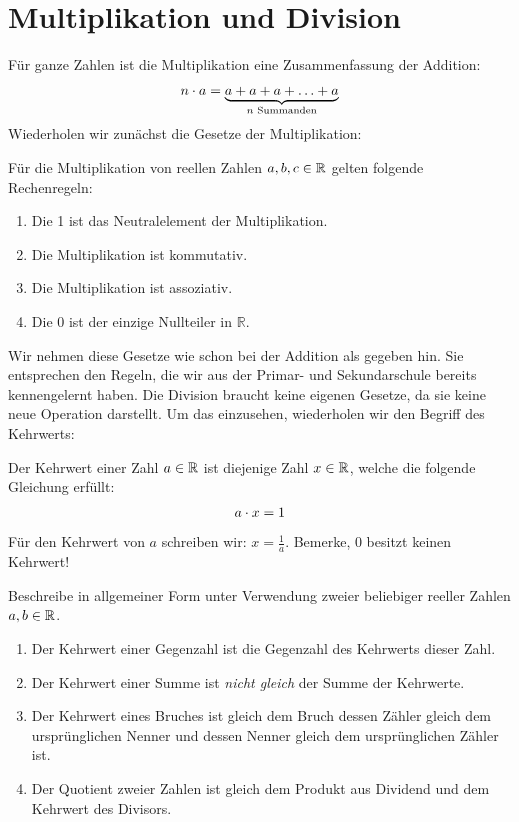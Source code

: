 \documentclass[11pt,oneside]{article}
\begin{document}
\newpage
\section{Multiplikation und Division}
    Für ganze Zahlen ist die Multiplikation eine Zusammenfassung der Addition:
    \begin{align*}
	   n \cdot a = \underbrace{a + a + a + \ldots + a}_{n \text{ Summanden}}
    \end{align*}
    Wiederholen wir zunächst die Gesetze der Multiplikation:
    \begin{satz}\label{satz:GesetzeDerMultiplikation}
    	Für die Multiplikation von reellen Zahlen $a,b,c\in\mathbb{R}$ gelten folgende Rechenregeln:
    	\begin{enumerate}
    		\item Die 1 ist das Neutralelement der Multiplikation.
    		\item Die Multiplikation ist kommutativ.
    		\item Die Multiplikation ist assoziativ.
    		\item Die 0 ist der einzige Nullteiler in $ \mathbb{R} $.
    	\end{enumerate}
    \end{satz}
    Wir nehmen diese Gesetze wie schon bei der Addition als gegeben hin. Sie entsprechen den Regeln, die wir aus der Primar- und Sekundarschule bereits kennengelernt haben. Die Division braucht keine eigenen Gesetze, da sie keine neue Operation darstellt. Um das einzusehen, wiederholen wir den Begriff des Kehrwerts:
    \begin{definition}
    	Der Kehrwert einer Zahl $a\in\mathbb{R}$ ist diejenige Zahl $x\in\mathbb{R}$, welche die folgende Gleichung erfüllt:
    	\begin{align*}
    		a\cdot x=1
    	\end{align*}
    	Für den Kehrwert von $a$ schreiben wir: $x=\frac{1}{a}$. Bemerke, $0$ besitzt keinen Kehrwert!
    \end{definition}
    \begin{beispiel}
    	Beschreibe in allgemeiner Form unter Verwendung zweier beliebiger reeller Zahlen $a,b\in\mathbb{R}$.
    	\begin{enumerate}[label=\alph*)]
    		\item Der Kehrwert einer Gegenzahl ist die Gegenzahl des Kehrwerts dieser Zahl.\\[5pt]
    		\item Der Kehrwert einer Summe ist \emph{nicht gleich} der Summe der Kehrwerte.\\[5pt]
    		\item Der Kehrwert eines Bruches ist gleich dem Bruch dessen Zähler gleich dem ursprünglichen Nenner und dessen Nenner gleich dem ursprünglichen Zähler ist.\\[5pt]
    		\item Der Quotient zweier Zahlen ist gleich dem Produkt aus Dividend und dem Kehrwert des Divisors.\\[5pt]
    	\end{enumerate}
    \end{beispiel}
\end{document}
